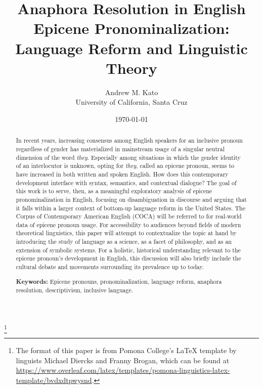 \documentclass{article}
\title{Anaphora Resolution in English Epicene Pronominalization:\\ Language Reform and Linguistic Theory}
\author{Andrew M. Kato\\University of California, Santa Cruz}
\date{\today}
\begin{document}
\maketitle\footnote{The format of this paper is from Pomona College's \LaTeX{} template by linguists Michael Diercks and Franny Brogan, which can be found at \href{https://www.overleaf.com/latex/templates/pomona-linguistics-latex-template/bvdxdtpwysnd}{https://www.overleaf.com/latex/templates/pomona-linguistics-latex-template/bvdxdtpwysnd}.}

\begin{abstract}

In recent years, increasing consensus among English speakers for an inclusive pronoun regardless of gender has materialized in mainstream usage of a singular neutral dimension of the word \textit{they}. Especially among situations in which the gender identity of an interlocutor is unknown, opting for \textit{they}, called an epicene pronoun, seems to have increased in both written and spoken English. How does this contemporary development interface with syntax, semantics, and contextual dialogue? The goal of this work is to serve, then, as a meaningful exploratory analysis of epicene pronominalization in English, focusing on disambiguation in discourse and arguing that it falls within a larger context of bottom-up language reform in the United States. The Corpus of Contemporary American English (COCA) will be referred to for real-world data of epicene pronoun usage. For accessibility to audiences beyond fields of modern theoretical linguistics, this paper will attempt to contextualize the topic at hand by introducing the study of language as a science, as a facet of philosophy, and as an extension of symbolic systems. For a holistic, historical understanding relevant to the epicene pronoun's development in English, this discussion will also briefly include the cultural debate and movements surrounding its prevalence up to today.

\hspace{0cm}

\hspace{-.45cm}\textbf{Keywords:} Epicene pronouns, pronominalization, language reform, anaphora resolution, descriptivism, inclusive language.


\end{abstract}
\end{document}
